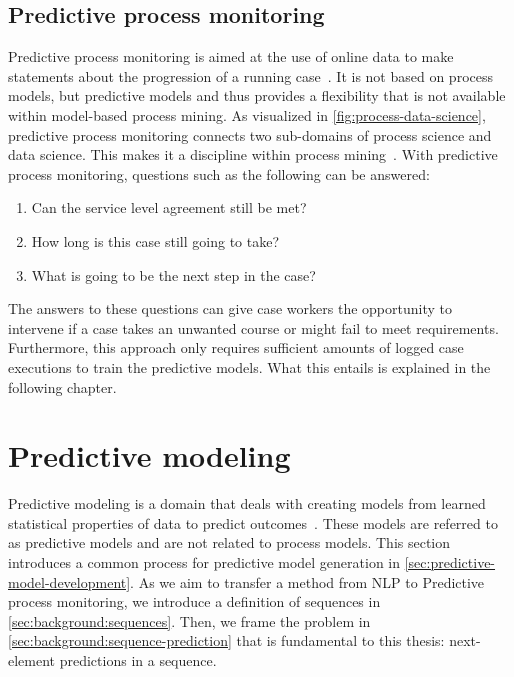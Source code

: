 \subsection{Predictive process monitoring}\label{sec:predictive-process-monitoring}
Predictive process monitoring is aimed at the use of online data to make statements about the progression of a running case~\cite{francescomarino2015, schoenig2018}. It is not based on process models, but predictive models and thus provides a flexibility that is not available within model-based process mining.  As visualized in \autoref{fig:process-data-science}, predictive process monitoring connects two sub-domains of process science and data science. This makes it a discipline within process mining~\cite{Aalst2016}. With predictive process monitoring, questions such as the following can be answered:

\begin{enumerate}
    \item Can the service level agreement still be met?
    \item How long is this case still going to take?
    \item What is going to be the next step in the case?
\end{enumerate}

The answers to these questions can give case workers the opportunity to intervene if a case takes an unwanted course or might fail to meet requirements. Furthermore, this approach only requires sufficient amounts of logged case executions to train the predictive models. What this entails is explained in the following chapter.

\section{Predictive modeling}\label{sec:predictive-modeling}
Predictive modeling is a domain that deals with creating models from learned statistical properties of data to predict outcomes~\cite{sivaganesan1994predictive}. These models are referred to as predictive models and are not related to process models. This section introduces a common process for predictive model generation in \autoref{sec:predictive-model-development}.
As we aim to transfer a method from NLP to Predictive process monitoring, we introduce a definition of sequences in \autoref{sec:background:sequences}. Then, we frame the problem in \autoref{sec:background:sequence-prediction} that is fundamental to this thesis: next-element predictions in a sequence.

